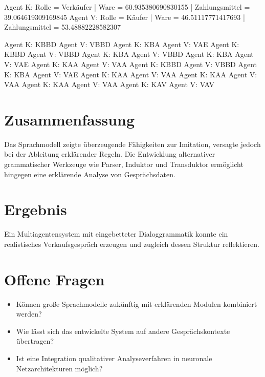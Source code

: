 \documentclass[12pt]{article}
\begin{document}
Agent K: Rolle = Verkäufer | Ware = 60.935380690830155 | Zahlungsmittel = 39.064619309169845
Agent V: Rolle = Käufer | Ware = 46.51117771417693 | Zahlungsmittel = 53.48882228582307

Agent K: KBBD
Agent V: VBBD
Agent K: KBA
Agent V: VAE
Agent K: KBBD
Agent V: VBBD
Agent K: KBA
Agent V: VBBD
Agent K: KBA
Agent V: VAE
Agent K: KAA
Agent V: VAA
Agent K: KBBD
Agent V: VBBD
Agent K: KBA
Agent V: VAE
Agent K: KAA
Agent V: VAA
Agent K: KAA
Agent V: VAA
Agent K: KAA
Agent V: VAA
Agent K: KAV
Agent V: VAV


\section{Zusammenfassung}
Das Sprachmodell zeigte überzeugende Fähigkeiten zur Imitation, versagte jedoch bei der Ableitung erklärender Regeln. Die Entwicklung alternativer grammatischer Werkzeuge wie Parser, Induktor und Transduktor ermöglicht hingegen eine erklärende Analyse von Gesprächsdaten.

\section{Ergebnis}
Ein Multiagentensystem mit eingebetteter Dialoggrammatik konnte ein realistisches Verkaufsgespräch erzeugen und zugleich dessen Struktur reflektieren.

\section{Offene Fragen}
\begin{itemize}
  \item Können große Sprachmodelle zukünftig mit erklärenden Modulen kombiniert werden?
  \item Wie lässt sich das entwickelte System auf andere Gesprächskontexte übertragen?
  \item Ist eine Integration qualitativer Analyseverfahren in neuronale Netzarchitekturen möglich?
\end{itemize}
\end{document}
